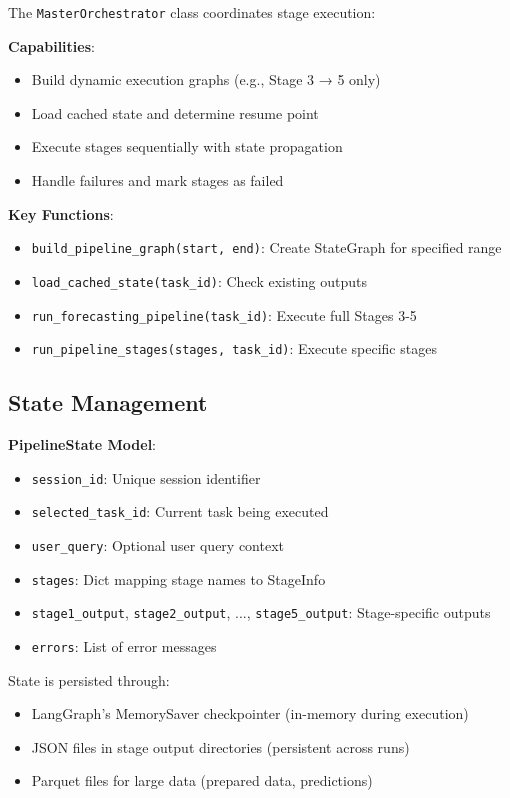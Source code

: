 \documentclass[11pt,a4paper]{article}
\begin{document}
The \texttt{MasterOrchestrator} class coordinates stage execution:

\textbf{Capabilities}:
\begin{itemize}
    \item Build dynamic execution graphs (e.g., Stage 3 → 5 only)
    \item Load cached state and determine resume point
    \item Execute stages sequentially with state propagation
    \item Handle failures and mark stages as failed
\end{itemize}

\textbf{Key Functions}:
\begin{itemize}
    \item \texttt{build\_pipeline\_graph(start, end)}: Create StateGraph for specified range
    \item \texttt{load\_cached\_state(task\_id)}: Check existing outputs
    \item \texttt{run\_forecasting\_pipeline(task\_id)}: Execute full Stages 3-5
    \item \texttt{run\_pipeline\_stages(stages, task\_id)}: Execute specific stages
\end{itemize}

\subsection{State Management}

\textbf{PipelineState Model}:
\begin{itemize}
    \item \texttt{session\_id}: Unique session identifier
    \item \texttt{selected\_task\_id}: Current task being executed
    \item \texttt{user\_query}: Optional user query context
    \item \texttt{stages}: Dict mapping stage names to StageInfo
    \item \texttt{stage1\_output}, \texttt{stage2\_output}, ..., \texttt{stage5\_output}: Stage-specific outputs
    \item \texttt{errors}: List of error messages
\end{itemize}

State is persisted through:
\begin{itemize}
    \item LangGraph's MemorySaver checkpointer (in-memory during execution)
    \item JSON files in stage output directories (persistent across runs)
    \item Parquet files for large data (prepared data, predictions)
\end{itemize}
\end{document}
